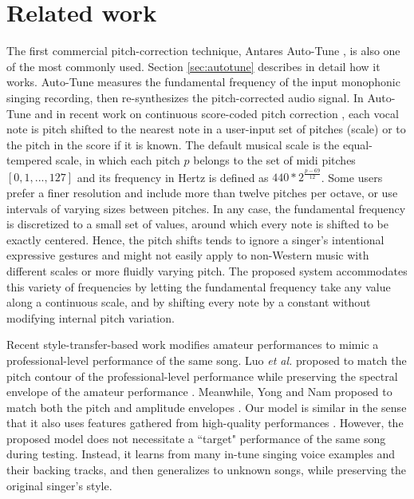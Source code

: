 \section{Related work}
The first commercial pitch-correction technique, Antares Auto-Tune \cite{antares:2016}, is also one of the most commonly used. Section \ref{sec:autotune} describes in detail how it works. Auto-Tune measures the fundamental frequency of the input monophonic singing recording, then re-synthesizes the pitch-corrected audio signal. In Auto-Tune and in recent work on continuous score-coded pitch correction \cite{salazar2015continuous}, each vocal note is pitch shifted to the nearest note in a user-input set of pitches (scale) or to the pitch in the score if it is known. The default musical scale is the equal-tempered scale, in which each pitch $p$ belongs to the set of \gls{midi} pitches $[0, 1, ..., 127]$ and its frequency in Hertz is defined as $440*2^{\frac{p-69}{12}}$. Some users prefer a finer resolution and include more than twelve pitches per octave, or use intervals of varying sizes between pitches. In any case, the fundamental frequency is discretized to a small set of values, around which every note is shifted to be exactly centered. Hence, the pitch shifts tends to ignore a singer's intentional expressive gestures and might not easily apply to non-Western music with different scales or more fluidly varying pitch. The proposed system accommodates this variety of frequencies by letting the fundamental frequency take any value along a continuous scale, and by shifting every note by a constant without modifying internal pitch variation.

Recent style-transfer-based work modifies amateur performances to mimic a professional-level performance of the same song. Luo \textit{et al.} proposed to match the pitch contour of the professional-level performance while preserving the spectral envelope of the amateur performance \cite{luo2018singing}. Meanwhile, Yong and Nam proposed to match both the pitch and amplitude envelopes \cite{yong2018singing}. Our model is similar in the sense that it also uses features gathered from high-quality performances \cite{wager2018intonation}. However, the proposed model does not necessitate a ``target" performance of the same song during testing. Instead, it learns from many in-tune singing voice examples and their backing tracks, and then generalizes to unknown songs, while preserving the original singer's style.

